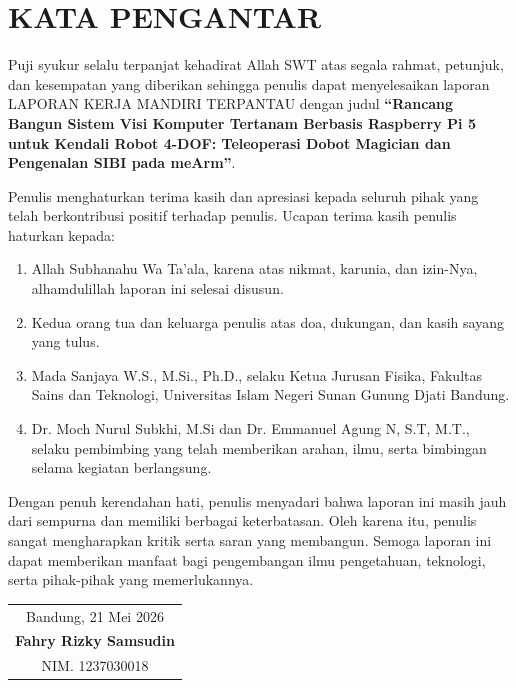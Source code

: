 \chapter*{\centering KATA PENGANTAR}

\vspace{0.5cm}
Puji syukur selalu terpanjat kehadirat Allah SWT atas segala rahmat, petunjuk, dan kesempatan yang diberikan sehingga penulis dapat menyelesaikan laporan LAPORAN KERJA MANDIRI TERPANTAU dengan judul \textbf{``Rancang Bangun Sistem Visi Komputer Tertanam Berbasis Raspberry Pi 5 untuk Kendali Robot 4-DOF: Teleoperasi Dobot Magician dan Pengenalan SIBI pada meArm''}.

Penulis menghaturkan terima kasih dan apresiasi kepada seluruh pihak yang telah berkontribusi positif terhadap penulis. Ucapan terima kasih penulis haturkan kepada:
\begin{enumerate}[label=\arabic*.]
    \item Allah Subhanahu Wa Ta'ala, karena atas nikmat, karunia, dan izin-Nya, alhamdulillah laporan ini selesai disusun.
    \item Kedua orang tua dan keluarga penulis atas doa, dukungan, dan kasih sayang yang tulus.
    \item Mada Sanjaya W.S., M.Si., Ph.D., selaku Ketua Jurusan Fisika, Fakultas Sains dan Teknologi, Universitas Islam Negeri Sunan Gunung Djati Bandung.
    \item Dr. Moch Nurul Subkhi, M.Si dan Dr. Emmanuel Agung N, S.T, M.T., selaku pembimbing yang telah memberikan arahan, ilmu, serta bimbingan selama kegiatan berlangsung.
\end{enumerate}

Dengan penuh kerendahan hati, penulis menyadari bahwa laporan ini masih jauh dari sempurna dan memiliki berbagai keterbatasan. Oleh karena itu, penulis sangat mengharapkan kritik serta saran yang membangun. Semoga laporan ini dapat memberikan manfaat bagi pengembangan ilmu pengetahuan, teknologi, serta pihak-pihak yang memerlukannya.

\vspace{1.5cm}
\begin{flushright}
\begin{tabular}{c}
Bandung, 21 Mei 2026\\[1.5cm]
\textbf{Fahry Rizky Samsudin}\\
NIM. 1237030018
\end{tabular}
\end{flushright}
\newpage
